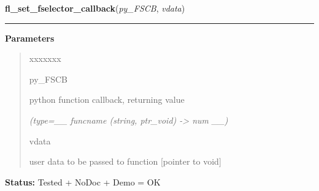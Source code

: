 \hspace{.8\funcindent}\begin{boxedminipage}{\funcwidth}

    \raggedright \textbf{fl\_set\_fselector\_callback}(\textit{py\_FSCB}, \textit{vdata})

    \vspace{-1.5ex}

    \rule{\textwidth}{0.5\fboxrule}
\setlength{\parskip}{2ex}
\setlength{\parskip}{1ex}
      \textbf{Parameters}
      \vspace{-1ex}

      \begin{quote}
        \begin{Ventry}{xxxxxxx}

          \item[py\_FSCB]

          python function callback, returning value

            {\it (type=\_\_ funcname (string, ptr\_void) -{\textgreater} num \_\_)}

          \item[vdata]

          user data to be passed to function [pointer to void]

        \end{Ventry}

      \end{quote}

\textbf{Status:} Tested + NoDoc + Demo = OK



    \end{boxedminipage}

    \label{xformslib:library:fl_set_fselector_callback}

    \vspace{0.5ex}

